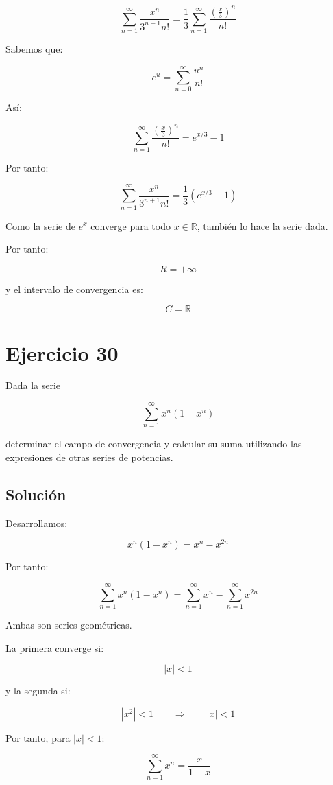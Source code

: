 \documentclass[fleqn]{article}
\begin{document}
	\[
	\sum_{n=1}^{\infty}
	\frac{x^n}{3^{n+1}n!}
	=
	\frac{1}{3}
	\sum_{n=1}^{\infty}
	\frac{\left(\frac{x}{3}\right)^n}{n!}
	\]

	Sabemos que:

	\[
	e^u
	=
	\sum_{n=0}^{\infty}
	\frac{u^n}{n!}
	\]

	Así:

	\[
	\sum_{n=1}^{\infty}
	\frac{\left(\frac{x}{3}\right)^n}{n!}
	=
	e^{x/3}-1
	\]

	Por tanto:

	\[
	\boxed{
	\sum_{n=1}^{\infty}
	\frac{x^n}{3^{n+1}n!}
	=
	\frac{1}{3}
	\left(
	e^{x/3}-1
	\right)
	}
	\]

	Como la serie de $e^x$ converge para todo $x\in\mathbb{R}$, también lo hace la serie dada.

	Por tanto:

	\[
	\boxed{
	R=+\infty
	}
	\]

	y el intervalo de convergencia es:

	\[
	\boxed{
	C=\mathbb{R}
	}
	\]

\section{Ejercicio 30}
	Dada la serie

	\[
	\sum_{n=1}^{\infty}x^n(1-x^n)
	\]

	determinar el campo de convergencia y calcular su suma utilizando las expresiones de otras series de potencias.

	\subsection{Solución}

	Desarrollamos:

	\[
	x^n(1-x^n)
	=
	x^n-x^{2n}
	\]

	Por tanto:

	\[
	\sum_{n=1}^{\infty}x^n(1-x^n)
	=
	\sum_{n=1}^{\infty}x^n
	-
	\sum_{n=1}^{\infty}x^{2n}
	\]

	Ambas son series geométricas.

	La primera converge si:

	\[
	|x|<1
	\]

	y la segunda si:

	\[
	|x^2|<1
	\qquad\Longrightarrow\qquad
	|x|<1
	\]

	Por tanto, para $|x|<1$:

	\[
	\sum_{n=1}^{\infty}x^n
	=
	\frac{x}{1-x}
	\]
\end{document}
